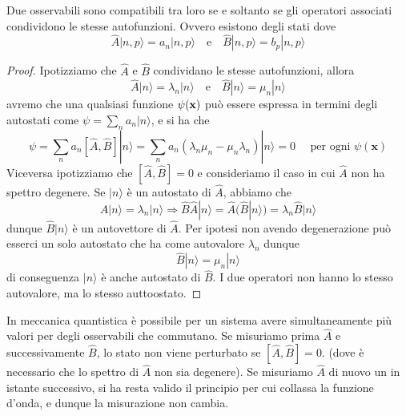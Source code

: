  \begin{theorem}
 	Due osservabili sono compatibili tra loro se e soltanto se gli operatori associati condividono le stesse autofunzioni. Ovvero esistono degli stati dove 
 	\begin{equation*}
 		\hat{A}|n,p \rangle  = a_n |n,p \rangle \quad \text{e} \quad \hat{B}|n,p \rangle = b_p |n,p \rangle  
 	\end{equation*}
 \end{theorem}
 
 \begin{proof}
 Ipotizziamo che $\hat{A}$ e $\hat{B}$ condividano le stesse autofunzioni, allora 
 \begin{equation*}
 	\hat{A} |n \rangle = \lambda_n |n \rangle  \quad \text{e} \quad \hat{B}|n \rangle = \mu_n |n \rangle 
 \end{equation*}
 avremo che una qualsiasi funzione $\psi(\bold{x})$ pu\`o essere espressa in termini degli autostati come $\psi = \sum_{n} a_n |n \rangle $, e si ha che 
 \begin{equation*}
 	[\hat{A},\hat{B}] \psi = \sum_{n} a_n [\hat{A},\hat{B}]|n \rangle = \sum_n a_n\left(\lambda_n \mu_n-\mu_n \lambda_n\right) |n \rangle =0 \quad \text { per ogni } \psi(\mathbf{x})
 \end{equation*}	
 Viceversa ipotizziamo che $[\hat{A},\hat{B}] = 0 $ e consideriamo il caso in cui $\hat{A}$ non ha spettro degenere. Se $|n \rangle $ \`e un autostato di $\hat{A}$, abbiamo che 
 \begin{equation*}
 	\hat{A} |n\rangle = \lambda_n |n \rangle \Rightarrow \hat{B} \hat{A}|n\rangle = \hat{A}(\hat{B} |n \rangle) =  \lambda_n\hat{B}|n \rangle  
 \end{equation*}
 dunque $\hat{B}|n \rangle$ \`e un autovettore di $\hat{A}$. Per ipotesi non avendo degenerazione pu\`o esserci un solo autostato che ha come autovalore $\lambda_n$ dunque 
 \begin{equation*}
 	\hat{B} |n \rangle  = \mu_n |n \rangle
 \end{equation*}
 di conseguenza $|n \rangle $ \`e anche autostato di $\hat{B}$. I due operatori non hanno lo stesso autovalore, ma lo stesso auttoostato.
 
 \end{proof}
 
\noindent In meccanica quantistica \`e possibile per un sistema avere simultaneamente pi\`u valori per degli osservabili che commutano. Se misuriamo prima $\hat{A}$ e successivamente $\hat{B}$, lo stato non viene perturbato se $[\hat{A},\hat{B}] = 0$. (dove \`e necessario che lo spettro di $\hat{A}$ non sia degenere). Se misuriamo $\hat{A}$ di nuovo un in istante successivo, si ha resta valido il principio per cui collassa la funzione d'onda, e dunque la misurazione non cambia.
 
